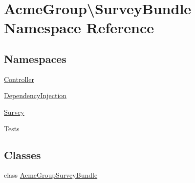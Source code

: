 \hypertarget{namespace_acme_group_1_1_survey_bundle}{\section{Acme\+Group\textbackslash{}Survey\+Bundle Namespace Reference}
\label{namespace_acme_group_1_1_survey_bundle}
}
\subsection*{Namespaces}
\begin{DoxyCompactItemize}
\item 
 \hyperlink{namespace_acme_group_1_1_survey_bundle_1_1_controller}{Controller}
\item 
 \hyperlink{namespace_acme_group_1_1_survey_bundle_1_1_dependency_injection}{Dependency\+Injection}
\item 
 \hyperlink{namespace_acme_group_1_1_survey_bundle_1_1_survey}{Survey}
\item 
 \hyperlink{namespace_acme_group_1_1_survey_bundle_1_1_tests}{Tests}
\end{DoxyCompactItemize}
\subsection*{Classes}
\begin{DoxyCompactItemize}
\item 
class \hyperlink{class_acme_group_1_1_survey_bundle_1_1_acme_group_survey_bundle}{Acme\+Group\+Survey\+Bundle}
\end{DoxyCompactItemize}
